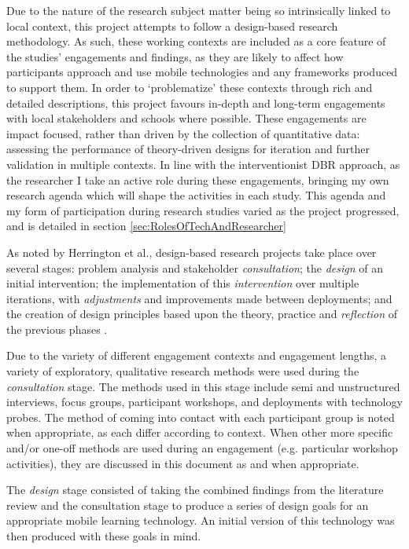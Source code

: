 Due to the nature of the research subject matter being so intrinsically linked to local context, this project attempts to follow a design-based research methodology. As such, these working contexts are included as a core feature of the studies' engagements and findings, as they are likely to affect how participants approach and use mobile technologies and any frameworks produced to support them. In order to `problematize' these contexts through rich and detailed descriptions, this project favours in-depth and long-term engagements with local stakeholders and schools where possible. These engagements are impact focused, rather than driven by the collection of quantitative data: assessing the performance of theory-driven designs for iteration and further validation in multiple contexts. In line with the interventionist DBR approach, as the researcher I take an active role during these engagements, bringing my own research agenda which will shape the activities in each study. This agenda and my form of participation during research studies varied as the project progressed, and is detailed in section \ref{sec:RolesOfTechAndResearcher} 

As noted by Herrington et al., design-based research projects take place over several stages: problem analysis and stakeholder \textit{consultation}; the \textit{design} of an initial intervention; the implementation of this \textit{intervention} over multiple iterations, with \textit{adjustments} and improvements made between deployments; and the creation of design principles based upon the theory, practice and \textit{reflection} of the previous phases \citep{herrington2009}. 

Due to the variety of different engagement contexts and engagement lengths, a variety of exploratory, qualitative research methods were used during the \textit{consultation} stage. The methods used in this stage include semi and unstructured interviews, focus groups, participant workshops, and deployments with technology probes. The method of coming into contact with each participant group is noted when appropriate, as each differ according to context. When other more specific and/or one-off methods are used during an engagement (e.g. particular workshop activities), they are discussed in this document as and when appropriate. 

The \textit{design} stage consisted of taking the combined findings from the literature review and the consultation stage to produce a series of design goals for an appropriate mobile learning technology. An initial version of this technology was then produced with these goals in mind. 

